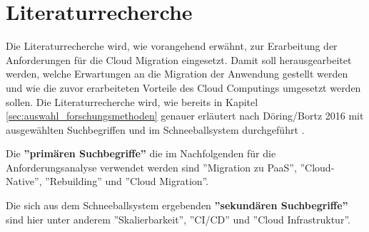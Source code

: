 \section{Literaturrecherche}
Die Literaturrecherche wird, wie vorangehend erwähnt, zur Erarbeitung der Anforderungen für die Cloud Migration eingesetzt. Damit soll herausgearbeitet werden, welche Erwartungen an die Migration der Anwendung gestellt werden und wie die zuvor erarbeiteten Vorteile des Cloud Computings umgesetzt werden sollen. Die Literaturrecherche wird, wie bereits in Kapitel \ref{sec:auswahl_forschungsmethoden} genauer erläutert nach Döring/Bortz 2016 mit ausgewählten Suchbegriffen und im Schneeballsystem durchgeführt \cite[S. 158ff]{Doering2016}.

Die \textbf{''primären Suchbegriffe''} \cite[S. 158]{Doering2016} die im Nachfolgenden für die Anforderungsanalyse verwendet werden sind ''Migration zu PaaS'', ''Cloud-Native'', ''Rebuilding'' und ''Cloud Migration''.

Die sich aus dem Schneeballsystem ergebenden \textbf{''sekundären Suchbegriffe''} \cite[S. 158]{Doering2016} sind hier unter anderem ''Skalierbarkeit'', ''CI/CD'' und ''Cloud Infrastruktur''. \pagebreak